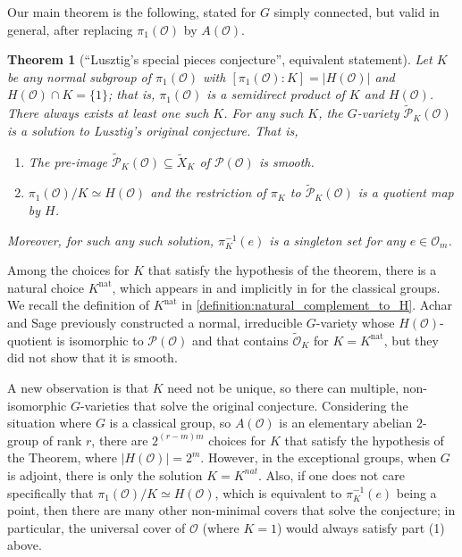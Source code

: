 \documentclass{amsart}
\newtheorem*{maintheorem}{Theorem}
\theoremstyle{definition}
\DeclareMathOperator{\nat}{nat}
\newcommand{\cP}{\mathcal{P}}
\newcommand{\covP}{\widetilde{\mathcal{P}}}
\newcommand{\0}{\mathcal{O}}
\begin{document}
Our main theorem is the following, stated for $G$ simply connected, but valid in general, after replacing $\pi_1(\0)$ by $A(\0)$.
\begin{maintheorem}[``Lusztig's special pieces conjecture'', equivalent statement] 
Let $K$ be any normal subgroup of $\pi_1(\0)$ with $[\pi_1(\0):K]=|H(\0)|$ and $H(\0) \cap K = \{1\}$; that is, $\pi_1(\0)$ is a semidirect product of $K$ and $H(\0)$. There always exists at least one such $K$.
For any such $K$, 
the $G$-variety 
$\covP_K(\0)$ is a solution to Lusztig's original conjecture.  That is,
\begin{enumerate}
    \item The pre-image $\covP_K(\0) \subseteq \widetilde{X}_K$ of $\cP(\0)$ is smooth.  
    \item $\pi_1(\0)/K \simeq H(\0)$ and the restriction of $\pi_K$ to $\covP_K(\0)$ is a quotient map by $H$. 
\end{enumerate}
Moreover, for such any such solution, $\pi_K^{-1}(e)$ is a singleton set for any $e \in \0_{m}$.  
\end{maintheorem}\label{Theorem:main}

Among the choices for $K$ that satisfy the hypothesis of the theorem, there is a natural choice  $K^{\nat}$, which appears in \cite{Achar-Sage-perverse} and implicitly in \cite{Kraft-Procesi:special} for the classical groups.
We recall the definition of $K^{\nat}$ in \cref{definition:natural_complement_to_H}.
Achar and Sage \cite{Achar-Sage-perverse} previously constructed a normal, irreducible $G$-variety whose $H(\0)$-quotient is isomorphic to ${\mathcal P}(\0)$ and that contains $\widetilde{\0}_K$ for $K=K^{\nat}$, but they did not show that it is smooth.  


A new observation is that $K$ need not be unique, so 
there can multiple, non-isomorphic 
$G$-varieties that solve the original conjecture.  
Considering the situation where $G$ is a classical group, so $A(\0)$ is an elementary abelian $2$-group of rank $r$, 
there are $2^{(r-m)m}$ choices for $K$ that satisfy
the hypothesis of the Theorem, where $|H(\0)| = 2^m$.  
However, in the exceptional groups, when $G$ is adjoint, 
there is only the solution $K=K^{nat}$.
Also, if one does not care specifically that $\pi_1(\0)/K \simeq H(\0)$, which is equivalent to $\pi_K^{-1}(e)$ being a point, then there are many other non-minimal covers that solve the conjecture; in particular, the universal cover of $\0$ (where $K=1$) would always satisfy part (1) above.
\end{document}
